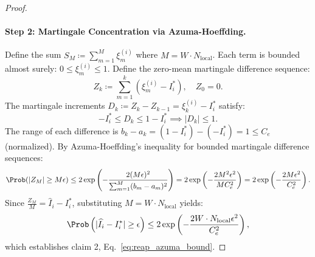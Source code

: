 \begin{proof}
\paragraph{Step 2: Martingale Concentration via Azuma-Hoeffding.}
Define the sum $S_M \coloneqq \sum_{m=1}^M \xi_m^{(i)}$ where $M = W \cdot N_{\text{local}}$.
Each term is bounded almost surely: $0 \le \xi_m^{(i)} \le 1$.
Define the zero-mean martingale difference sequence:
\begin{equation}
Z_k \coloneqq \sum_{m=1}^k (\xi_m^{(i)} - I_i^*), \quad Z_0 = 0.
\end{equation}
The martingale increments $D_k \coloneqq Z_k - Z_{k-1} = \xi_k^{(i)} - I_i^*$ satisfy:
\begin{equation}
-I_i^* \le D_k \le 1 - I_i^* \implies |D_k| \le 1.
\end{equation}
The range of each difference is $b_k - a_k = (1 - I_i^*) - (-I_i^*) = 1 \le C_e$ (normalized).
By Azuma-Hoeffding's inequality for bounded martingale difference sequences:
\begin{equation}
\Prob(|Z_M| \ge M \epsilon) \le 2 \exp\left( -\frac{2 (M \epsilon)^2}{\sum_{m=1}^M (b_m - a_m)^2} \right) = 2 \exp\left( -\frac{2 M^2 \epsilon^2}{M C_e^2} \right) = 2 \exp\left( -\frac{2 M \epsilon^2}{C_e^2} \right).
\end{equation}
Since $\frac{Z_M}{M} = \widehat{I}_i - I_i^*$, substituting $M = W \cdot N_{\text{local}}$ yields:
\begin{equation}
\Prob\left( |\widehat{I}_i - I_i^*| \ge \epsilon \right) \le 2 \exp\left( -\frac{2 W \cdot N_{\text{local}} \epsilon^2}{C_e^2} \right),
\end{equation}
which establishes claim 2, Eq.~\eqref{eq:reap_azuma_bound}.


\end{proof}
